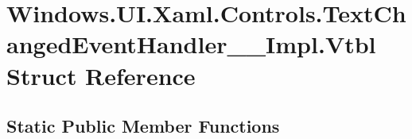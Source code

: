 \hypertarget{struct_windows_1_1_u_i_1_1_xaml_1_1_controls_1_1_text_changed_event_handler_____impl_1_1_vtbl}{}\section{Windows.\+U\+I.\+Xaml.\+Controls.\+Text\+Changed\+Event\+Handler\+\_\+\+\_\+\+Impl.\+Vtbl Struct Reference}
\label{struct_windows_1_1_u_i_1_1_xaml_1_1_controls_1_1_text_changed_event_handler_____impl_1_1_vtbl}
\subsection*{Static Public Member Functions}
